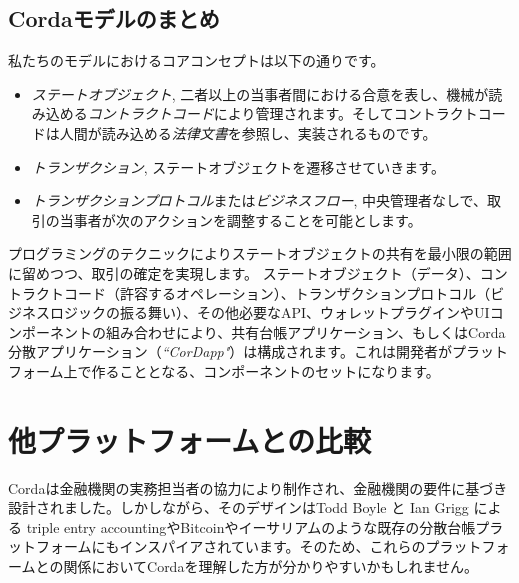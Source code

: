 \documentclass{article}
\begin{document}
\subsection{Cordaモデルのまとめ}
私たちのモデルにおけるコアコンセプトは以下の通りです。
\begin{itemize}
\item \textit{ステートオブジェクト}, 二者以上の当事者間における合意を表し、機械が読み込める\textit{コントラクトコード}により管理されます。そしてコントラクトコードは人間が読み込める\textit{法律文書}を参照し、実装されるものです。
\item \textit{トランザクション}, ステートオブジェクトを遷移させていきます。
\item \textit{トランザクションプロトコル}または\textit{ビジネスフロー}, 中央管理者なしで、取引の当事者が次のアクションを調整することを可能とします。\end{itemize}
プログラミングのテクニックによりステートオブジェクトの共有を最小限の範囲に留めつつ、取引の確定を実現します。
ステートオブジェクト（データ）、コントラクトコード（許容するオペレーション）、トランザクションプロトコル（ビジネスロジックの振る舞い）、その他必要なAPI、ウォレットプラグインやUIコンポーネントの組み合わせにより、共有台帳アプリケーション、もしくはCorda分散アプリケーション（\textit{``CorDapp"}）は構成されます。これは開発者がプラットフォーム上で作ることとなる、コンポーネントのセットになります。
\section{他プラットフォームとの比較}
Cordaは金融機関の実務担当者の協力により制作され、金融機関の要件に基づき設計されました。しかしながら、そのデザインはTodd Boyle と Ian Grigg による triple entry accounting\cite{Triple}やBitcoin\cite{Bitcoin}やイーサリアムのような既存の分散台帳プラットフォームにもインスパイアされています。そのため、これらのプラットフォームとの関係においてCordaを理解した方が分かりやすいかもしれません。
\end{document}
